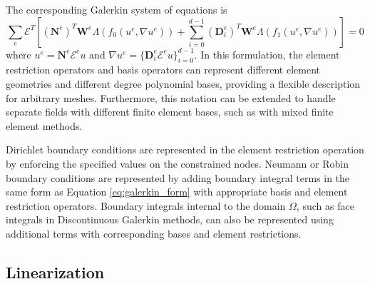 The corresponding Galerkin system of equations is
\begin{equation}
\sum_e \mathcal{E}^T \left[ \left( \mathbf{N}^e \right)^T \mathbf{W}^e \Lambda \left( f_0 \left( u^e, \nabla u^e \right) \right) + \sum_{i = 0}^{d - 1} \left( \mathbf{D}_i^e \right)^T \mathbf{W}^e \Lambda \left( f_1 \left( u^e, \nabla u^e \right) \right) \right] = 0
\label{eq:galerkin_form}
\end{equation}
where $u^e = \mathbf{N}^e \mathcal{E}^e u$ and $\nabla u^e = \lbrace \mathbf{D}_i^e \mathcal{E}^e u \rbrace_{i = 0}^{d - 1}$.
In this formulation, the element restriction operators and basis operators can represent different element geometries and different degree polynomial bases, providing a flexible description for arbitrary meshes.
Furthermore, this notation can be extended to handle separate fields with different finite element bases, such as with mixed finite element methods.

Dirichlet boundary conditions are represented in the element restriction operation by enforcing the specified values on the constrained nodes.
Neumann or Robin boundary conditions are represented by adding boundary integral terms in the same form as Equation \ref{eq:galerkin_form} with appropriate basis and element restriction operators.
Boundary integrals internal to the domain $\Omega$, such as face integrals in Discontinuous Galerkin methods, can also be represented using additional terms with corresponding bases and element restrictions.

\subsection{Linearization}

